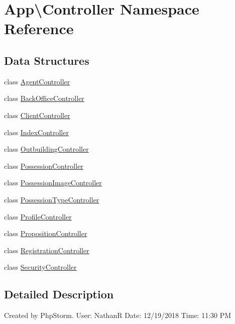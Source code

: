 \hypertarget{namespace_app_1_1_controller}{}\section{App\textbackslash{}Controller Namespace Reference}
\label{namespace_app_1_1_controller}
\subsection*{Data Structures}
\begin{DoxyCompactItemize}
\item 
class \mbox{\hyperlink{class_app_1_1_controller_1_1_agent_controller}{Agent\+Controller}}
\item 
class \mbox{\hyperlink{class_app_1_1_controller_1_1_back_office_controller}{Back\+Office\+Controller}}
\item 
class \mbox{\hyperlink{class_app_1_1_controller_1_1_client_controller}{Client\+Controller}}
\item 
class \mbox{\hyperlink{class_app_1_1_controller_1_1_index_controller}{Index\+Controller}}
\item 
class \mbox{\hyperlink{class_app_1_1_controller_1_1_outbuilding_controller}{Outbuilding\+Controller}}
\item 
class \mbox{\hyperlink{class_app_1_1_controller_1_1_possession_controller}{Possession\+Controller}}
\item 
class \mbox{\hyperlink{class_app_1_1_controller_1_1_possession_image_controller}{Possession\+Image\+Controller}}
\item 
class \mbox{\hyperlink{class_app_1_1_controller_1_1_possession_type_controller}{Possession\+Type\+Controller}}
\item 
class \mbox{\hyperlink{class_app_1_1_controller_1_1_profile_controller}{Profile\+Controller}}
\item 
class \mbox{\hyperlink{class_app_1_1_controller_1_1_proposition_controller}{Proposition\+Controller}}
\item 
class \mbox{\hyperlink{class_app_1_1_controller_1_1_registration_controller}{Registration\+Controller}}
\item 
class \mbox{\hyperlink{class_app_1_1_controller_1_1_security_controller}{Security\+Controller}}
\end{DoxyCompactItemize}


\subsection{Detailed Description}
Created by Php\+Storm. User\+: NathanR Date\+: 12/19/2018 Time\+: 11\+:30 PM

